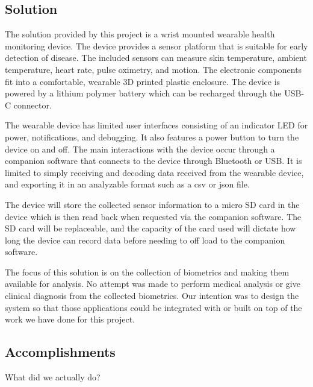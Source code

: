 \subsection{Solution}

The solution provided by this project is a wrist mounted wearable health 
monitoring device. The device provides a sensor platform that is suitable for 
early detection of disease. The included sensors can measure skin temperature, 
ambient temperature, heart rate, pulse oximetry, and motion.  The electronic
components fit into a comfortable, wearable 3D printed plastic enclosure.
The device is powered by a lithium polymer battery which can be recharged
through the USB-C connector.

The wearable device has limited user interfaces consisting of an indicator
LED for power, notifications, and debugging. It also features a power button
to turn the device on and off. The main interactions with the device occur 
through a companion software that connects to the device through Bluetooth or 
USB. It is limited to simply receiving and decoding data received from the 
wearable device, and exporting it in an analyzable format such as a csv or json 
file.

The device will store the collected sensor information to a micro SD card
in the device which is then read back when requested via the companion software.
The SD card will be replaceable, and the capacity of the card used will dictate
how long the device can record data before needing to off load to the companion
software.

The focus of this solution is on the collection of biometrics and making them
available for analysis. No attempt was made to perform medical analysis
or give clinical diagnosis from the collected biometrics. Our intention was to
design the system so that those applications could be integrated with or built
on top of the work we have done for this project.

\subsection{Accomplishments}

What did we actually do?


